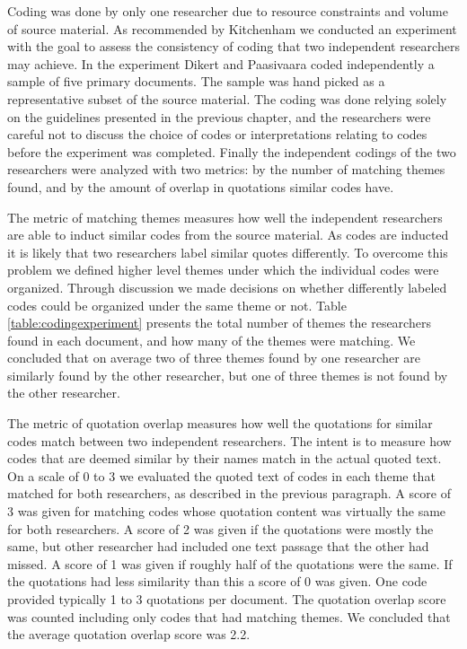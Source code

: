 \documentclass[preprint,authoryear,12pt]{elsarticle}
\begin{document}
Coding was done by only one researcher due to resource constraints and volume of
source material. As recommended by Kitchenham \cite{Kitchenham2007} we conducted
an experiment with the goal to assess the consistency of coding that two
independent researchers may achieve.
In the experiment Dikert and Paasivaara coded independently a sample of five
primary documents. The sample was hand picked as a representative subset of the
source material. The coding was done relying solely on the guidelines presented
in the previous chapter, and the researchers were careful not to discuss the
choice of codes or interpretations relating to codes before the experiment was
completed. Finally the independent codings of the two researchers were analyzed
with two metrics: by the number of matching themes found, and by the amount of
overlap in quotations similar codes have.

The metric of matching themes measures how well the independent researchers are
able to induct similar codes from the source material. As codes are inducted it
is likely that two researchers label similar quotes differently. To overcome
this problem we defined higher level themes under which the individual codes
were organized. Through discussion we made decisions on whether differently
labeled codes could be organized under the same theme or not. Table
\ref{table:codingexperiment} presents the total number of themes the researchers
found in each document, and how many of the themes were matching. We concluded
that on average two of three themes found by one researcher are similarly found
by the other researcher, but one of three themes is not found by the other
researcher.

The metric of quotation overlap measures how well the quotations for similar
codes match between two independent researchers. The intent is to measure how
codes that are deemed similar by their names match in the actual quoted text. On
a scale of 0 to 3 we evaluated the quoted text of codes in each theme that
matched for both researchers, as described in the previous paragraph. A score of
3 was given for matching codes whose quotation content was virtually the same
for both researchers. A score of 2 was given if the quotations were mostly the
same, but other researcher had included one text passage that the other had
missed. A score of 1 was given if roughly half of the quotations were the same.
If the quotations had less similarity than this a score of 0 was given. One code
provided typically 1 to 3 quotations per document. The quotation overlap score
was counted including only codes that had matching themes. We concluded that the
average quotation overlap score was 2.2.
\end{document}
